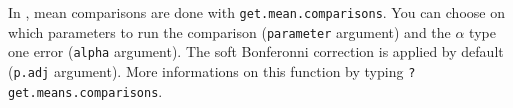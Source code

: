 %
%
%
%
%
%
%
%
%
%
%
%

In \pack, mean comparisons are done with \texttt{get.mean.comparisons}.
You can choose on which parameters to run the comparison (\texttt{parameter} argument) and the $\alpha$ type one error (\texttt{alpha} argument).
The soft Bonferonni correction is applied by default (\texttt{p.adj} argument).
More informations on this function by typing \texttt{?get.means.comparisons}.

